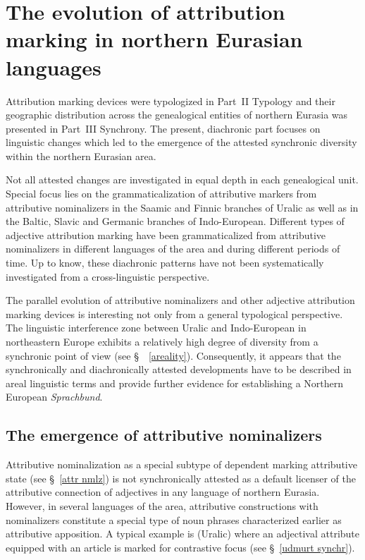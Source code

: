 
\chapter[The evolution of attribution marking]{The evolution of attribution marking in northern Eurasian languages}
Attribution marking devices were typologized in Part~II Typology and their geographic distribution across the genealogical entities of northern Eurasia was presented in Part~III Synchrony. The present, diachronic part focuses on linguistic changes which led to the emergence of the attested synchronic diversity within the northern Eurasian area.

Not all attested changes are investigated in equal depth in each genealogical unit. Special focus lies on the grammaticalization of attributive markers from attributive nominalizers in the Saamic  and Finnic branches of Uralic as well as in the Baltic, Slavic and Germanic branches of Indo-European. Different types of adjective attribution marking have been grammaticalized from attributive nominalizers in different languages of the area and during different periods of time. Up to know, these diachronic patterns have not been systematically investigated from a cross-linguistic perspective.

The parallel evolution of attributive nominalizers and other adjective attribution marking devices is interesting not only from a general typological perspective. The linguistic interference zone between Uralic and Indo-European in northeastern Europe exhibits a relatively high degree of diversity from a synchronic point of view (see \S~~\ref{areality}). Consequently, it appears that the synchronically and diachronically attested developments have to be described in areal linguistic terms and provide further evidence for establishing a Northern European \textit{Sprachbund}.

\section[Attributive nominalizers]{The emergence of attributive nominalizers}
Attributive nominalization as a special subtype of dependent marking attributive state (see \S~\ref{attr nmlz}) is not synchronically attested as a default licenser of the attributive connection of adjectives in any language of northern Eurasia. However, in several languages of the area, attributive constructions with nominalizers constitute a special type of noun phrases characterized earlier as attributive apposition. A typical example is  (Uralic) where an adjectival attribute equipped with an article is marked for contrastive focus (see \S~\ref{udmurt synchr}).

